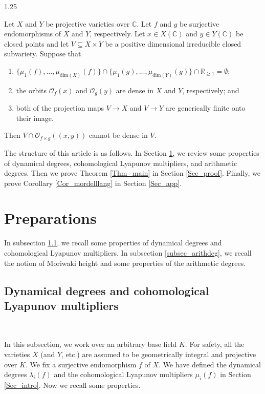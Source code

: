 \documentclass[12pt]{amsart}
\begin{document}
\begin{spacing}{1.25}
\begin{corollary}\label{Cor_mordelllang}
Let $X$ and $Y$ be projective varieties over $\mathbb{C}$. Let $f$ and $g$ be surjective endomorphisms of $X$ and $Y$, respectively. Let $x\in X(\mathbb{C})$ and $y\in Y(\mathbb{C})$ be closed points and let $V\subseteq X\times Y$ be a positive dimensional irreducible closed subvariety. Suppose that
\begin{enumerate}
\item
$\{\mu_1(f),\dots,\mu_{\mathrm{dim}(X)}(f)\}\cap\{\mu_1(g),\dots,\mu_{\mathrm{dim}(Y)}(g)\}\cap\mathbb{R}_{\geq1}=\emptyset$;
\item
the orbits $\mathcal{O}_f(x)$ and $\mathcal{O}_g(y)$ are dense in $X$ and $Y$, respectively; and
\item
both of the projection maps $V\rightarrow X$ and $V\rightarrow Y$ are generically finite onto their image.
\end{enumerate}
Then $V\cap\mathcal{O}_{f\times g}((x,y))$ cannot be dense in $V$.
\end{corollary}

The structure of this article is as follows. In Section \ref{Sec_pre}, we review some properties of dynamical degrees, cohomological Lyapunov multipliers, and arithmetic degrees. Then we prove Theorem \ref{Thm_main} in Section \ref{Sec_proof}. Finally, we prove Corollary \ref{Cor_mordelllang} in Section \ref{Sec_app}.










\section{Preparations}\label{Sec_pre}
In subsection \ref{subsec_dyndeg}, we recall some properties of dynamical degrees and cohomological Lyapunov multipliers. In subsection \ref{subsec_arithdeg}, we recall the notion of Moriwaki height and some properties of the arithmetic degrees.


\subsection{Dynamical degrees and cohomological Lyapunov multipliers}\label{subsec_dyndeg}

\ 

In this subsection, we work over an arbitrary base field $K$. For safety, all the varieties $X$ (and $Y$, etc.) are assumed to be geometrically integral and projective over $K$. We fix a surjective endomorphism $f$ of $X$. We have defined the dynamical degrees $\lambda_i(f)$ and the cohomological Lyapunov multipliers $\mu_i(f)$ in Section \ref{Sec_intro}. Now we recall some properties.


\end{spacing}
\end{document}
